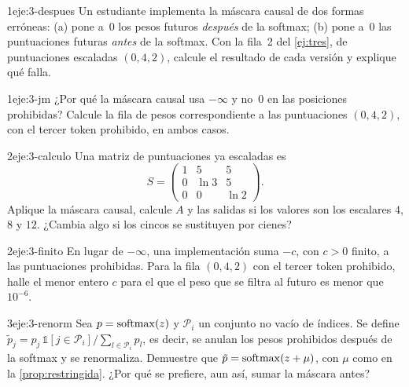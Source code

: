 \begin{ejercicio}{1}{eje:3-despues}
Un estudiante implementa la máscara causal de dos formas erróneas: (a) pone a~0 los pesos futuros \emph{después} de la softmax; (b) pone a~0 las puntuaciones futuras \emph{antes} de la softmax. Con la fila~2 del \cref{ej:tres}, de puntuaciones escaladas $(0,4,2)$, calcule el resultado de cada versión y explique qué falla.
\end{ejercicio}

\begin{ejercicio}{1}{eje:3-jm}
¿Por qué la máscara causal usa $-\infty$ y no~0 en las posiciones prohibidas? Calcule la fila de pesos correspondiente a las puntuaciones $(0,4,2)$, con el tercer token prohibido, en ambos casos.
\end{ejercicio}

\begin{ejercicio}{2}{eje:3-calculo}
Una matriz de puntuaciones ya escaladas es
\[
S=\begin{pmatrix}1&5&5\\0&\ln 3&5\\0&0&\ln 2\end{pmatrix}.
\]
Aplique la máscara causal, calcule $A$ y las salidas si los valores son los escalares $4$, $8$ y $12$. ¿Cambia algo si los cincos se sustituyen por cienes?
\end{ejercicio}

\begin{ejercicio}{2}{eje:3-finito}
En lugar de $-\infty$, una implementación suma $-c$, con $c>0$ finito, a las puntuaciones prohibidas. Para la fila $(0,4,2)$ con el tercer token prohibido, halle el menor entero $c$ para el que el peso que se filtra al futuro es menor que $10^{-6}$.
\end{ejercicio}

\begin{ejercicio}{3}{eje:3-renorm}
Sea $p=\operatorname{softmax}(z)$ y $\mathcal{P}_i$ un conjunto no vacío de índices. Se define $\tilde p_j=p_j\,\mathbb{1}[j\in\mathcal{P}_i]/\sum_{l\in\mathcal{P}_i}p_l$, es decir, se anulan los pesos prohibidos después de la softmax y se renormaliza. Demuestre que $\tilde p=\operatorname{softmax}(z+\mu)$, con $\mu$ como en la \cref{prop:restringida}. ¿Por qué se prefiere, aun así, sumar la máscara antes?
\end{ejercicio}
